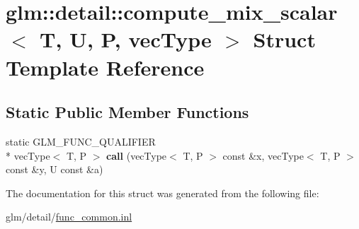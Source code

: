 \hypertarget{structglm_1_1detail_1_1compute__mix__scalar}{\section{glm\-:\-:detail\-:\-:compute\-\_\-mix\-\_\-scalar$<$ T, U, P, vec\-Type $>$ Struct Template Reference}
\label{structglm_1_1detail_1_1compute__mix__scalar}
}
\subsection*{Static Public Member Functions}
\begin{DoxyCompactItemize}
\item 
\hypertarget{structglm_1_1detail_1_1compute__mix__scalar_a15fb89e5dac67f6645419fd7eaebdc5f}{static G\-L\-M\-\_\-\-F\-U\-N\-C\-\_\-\-Q\-U\-A\-L\-I\-F\-I\-E\-R \\*
vec\-Type$<$ T, P $>$ {\bfseries call} (vec\-Type$<$ T, P $>$ const \&x, vec\-Type$<$ T, P $>$ const \&y, U const \&a)}\label{structglm_1_1detail_1_1compute__mix__scalar_a15fb89e5dac67f6645419fd7eaebdc5f}

\end{DoxyCompactItemize}


The documentation for this struct was generated from the following file\-:\begin{DoxyCompactItemize}
\item 
glm/detail/\hyperlink{func__common_8inl}{func\-\_\-common.\-inl}\end{DoxyCompactItemize}
